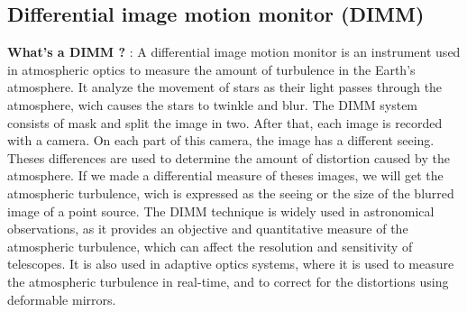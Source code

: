 \subsection{Differential image motion monitor (DIMM)}
\textbf{What's a DIMM ?} : \newline A differential image motion monitor is an instrument used in atmospheric optics to measure the amount of turbulence
in the Earth's atmosphere. It analyze the movement of stars as their light passes through the atmosphere, wich causes the stars to twinkle and blur.
\newline
The DIMM system consists of mask and split the image in two. After that, each image is recorded with a camera. On each part of this camera, the image
has a different seeing. Theses differences are used to determine the amount of distortion caused by the atmosphere.\newline
If we made a differential measure of theses images, we will get the atmospheric turbulence, wich is expressed as the seeing or the size of the
blurred image of a point source. \newline
The DIMM technique is widely used in astronomical observations, as it provides an objective and quantitative measure of the atmospheric turbulence,
which can affect the resolution and sensitivity of telescopes. It is also used in adaptive optics systems, where it is used to measure the atmospheric
turbulence in real-time, and to correct for the distortions using deformable mirrors.

